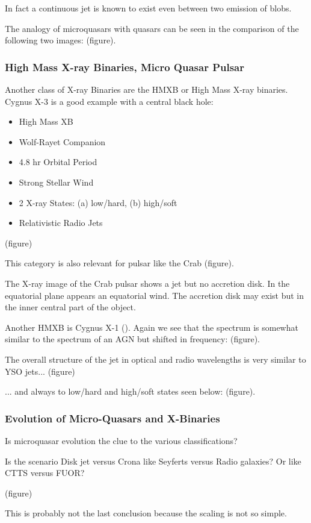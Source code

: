 \documentclass[10pt,a4paper,english]{article}
\begin{document}
In fact a continuous jet is known to exist even between two emission
of blobs.

The analogy of microquasars with quasars can be seen in the comparison
of the following two images: (figure).

\subsubsection{High Mass X-ray Binaries, Micro Quasar Pulsar}
Another class of X-ray Binaries are the HMXB or High Mass X-ray binaries. Cygnus X-3 is a good example with a central black hole:
\begin{itemize}
    \item High Mass XB
    \item Wolf-Rayet Companion
    \item 4.8 hr Orbital Period
    \item Strong Stellar Wind
    \item 2 X-ray States: (a) low/hard, (b) high/soft
    \item Relativistic Radio Jets
\end{itemize}

(figure)

This category is also relevant for pulsar like the Crab (figure).

The X-ray image of the Crab pulsar shows a jet but no accretion disk. In the equatorial plane appears an equatorial wind. The accretion disk may exist but in the inner central part of the object.

Another HMXB is Cygnus X-1 (\cite{2005A&A...429..267B}). Again we see that the spectrum is somewhat similar to the spectrum of an AGN but shifted in frequency: (figure).

The overall structure of the jet in optical and radio wavelengths is very similar to YSO jets... (figure)

... and always to low/hard and high/soft states seen below: (figure).

\subsubsection{Evolution of Micro-Quasars and X-Binaries}
Is microquasar evolution the clue to the various classifications?

Is the scenario Disk jet versus Crona like Seyferts versus Radio galaxies? Or like CTTS versus FUOR?

(figure)

This is probably not the last conclusion because the scaling is not so simple.
\end{document}
